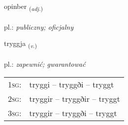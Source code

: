 \documentclass[frontgrid, backgrid]{flacards}\usepackage[]{graphicx}\usepackage[]{xcolor}
\begin{document}
{opinber \small{\textsubscript{(\textit{adj.})}} \\[1ex] %
\textphonetic{[ɔːpɪnpɛr]} \\
pl.: \emph{publiczny; oficjalny} \\  [2ex]
\renewcommand*{\arraystretch}{0.8}
}

\renewcommand{\flhead}{\vskip5pt \fboxsep=0pt {\small\bfseries\footnotesize Sagnorð | Verb}}
\renewcommand{\fcfoot}{\vskip5pt \fboxsep=0pt \hspace{2pt}{\small\bfseries\footnotesize 1K}}

\renewcommand{\blhead}{\vskip5pt {\small\bfseries\footnotesize Sagnorð | Verb }}
\renewcommand{\bcfoot}{\vskip5pt \hspace{2pt}{\small\bfseries\footnotesize 1K}}


{tryggja \small{\textsubscript{(\textit{v.})}} \\[1ex] %
\textphonetic{[tʰrɪca]} \\
pl.: \emph{zapewnić; gwarantować} \\  [2ex]
\renewcommand*{\arraystretch}{0.8}
\begin{tabular}{p{1cm}l}
\textsc{1sg}: & tryggi -- tryggði -- tryggt \\ 
\textsc{2sg}: & tryggir -- tryggðir -- tryggt \\ 
\textsc{3sg}: & tryggir -- tryggði -- tryggt \\ 
\end{tabular}
}

\renewcommand{\flhead}{\vskip5pt \fboxsep=0pt {\small\bfseries\footnotesize Nafnorð | Noun}}
\renewcommand{\fcfoot}{\vskip5pt \fboxsep=0pt \hspace{2pt}{\small\bfseries\footnotesize 1K}}
\end{document}
